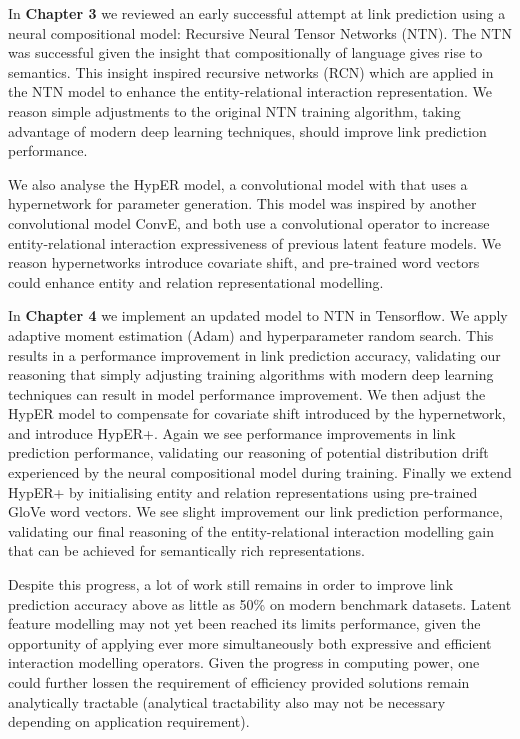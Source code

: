 \noindent In \textbf{Chapter 3} we reviewed an early successful attempt at link prediction using a neural compositional model: Recursive Neural Tensor Networks (NTN). The NTN was successful given the insight that compositionally of language gives rise to semantics. This insight inspired recursive networks (RCN) which are applied in the NTN model to enhance the entity-relational interaction representation. We reason simple adjustments to the original NTN training algorithm, taking advantage of modern deep learning techniques, should improve link prediction performance. \newpage 

\noindent We also analyse the HypER model, a convolutional model with that uses a hypernetwork for parameter generation. This model was inspired by another convolutional model ConvE, and both use a convolutional operator to increase entity-relational interaction expressiveness of previous latent feature models. We reason hypernetworks introduce covariate shift, and pre-trained word vectors could enhance entity and relation representational modelling. \par

\noindent In \textbf{Chapter 4} we implement an updated model to NTN in Tensorflow. We apply adaptive moment estimation (Adam) and hyperparameter random search. This results in a performance improvement in link prediction accuracy, validating our reasoning that simply adjusting training algorithms with modern deep learning techniques can result in model performance improvement. We then adjust the HypER model to compensate for covariate shift introduced by the hypernetwork, and introduce HypER+. Again we see performance improvements in link prediction performance, validating our reasoning of potential distribution drift experienced by the neural compositional model during training. Finally we extend HypER+ by initialising entity and relation representations using pre-trained GloVe word vectors. We see slight improvement our link prediction performance, validating our final reasoning of the entity-relational interaction modelling gain that can be achieved for semantically rich representations. \par

\noindent Despite this progress, a lot of work still remains in order to improve link prediction accuracy above as little as 50\% on modern benchmark datasets. Latent feature modelling may not yet been reached its limits performance, given the opportunity of applying ever more simultaneously both expressive and efficient interaction modelling operators. Given the progress in computing power, one could further lossen the requirement of efficiency provided solutions remain analytically tractable (analytical tractability also may not be necessary depending on application requirement).\par

